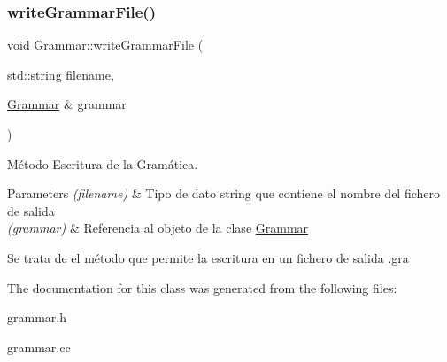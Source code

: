 \subsubsection{\texorpdfstring{write\+Grammar\+File()}{writeGrammarFile()}}
{\footnotesize\ttfamily void Grammar\+::write\+Grammar\+File (\begin{DoxyParamCaption}\item[{std\+::string}]{filename,  }\item[{\hyperlink{classGrammar}{Grammar} \&}]{grammar }\end{DoxyParamCaption})}



Método Escritura de la Gramática. 


\begin{DoxyParams}{Parameters}
{\em (filename)} & Tipo de dato string que contiene el nombre del fichero de salida \\
\hline
{\em (grammar)} & Referencia al objeto de la clase \hyperlink{classGrammar}{Grammar}\\
\hline
\end{DoxyParams}
Se trata de el método que permite la escritura en un fichero de salida .gra 

The documentation for this class was generated from the following files\+:\begin{DoxyCompactItemize}
\item 
grammar.\+h\item 
grammar.\+cc\end{DoxyCompactItemize}
